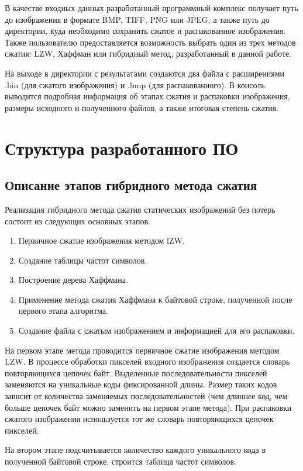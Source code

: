 В качестве входных данных разработанный программный комплекс получает путь до изображения в формате BMP, TIFF, PNG или JPEG, а также путь до директории, куда необходимо сохранить сжатое и распакованное изображения. Также пользователю предоставляется возможность выбрать один из трех методов сжатия: LZW, Хаффман или гибридный метод, разработанный в данной работе.

На выходе в директории с результатами создаются два файла с расширениями .bin (для сжатого изображения) и .bmp (для распакованного). В консоль выводится подробная информация об этапах сжатия и распаковки изображения, размеры исходного и полученного файлов, а также итоговая степень сжатия.

\section{Структура разработанного ПО}

\subsection{Описание этапов гибридного метода сжатия}

Реализация гибридного метода сжатия статических изображений без потерь состоит из следующих основных этапов.
\begin{enumerate}
    \item Первичное сжатие изображения методом lZW.
    \item Создание таблицы частот символов.
    \item Построение дерева Хаффмана.
    \item Применение метода сжатия Хаффмана к байтовой строке, полученной после первого этапа алгоритма.
    \item Создание файла с сжатым изображением и информацией для его распаковки.
\end{enumerate}

На первом этапе метода проводится первичное сжатие изображения методом LZW. В процессе обработки пикселей входного изображения создается словарь повторяющихся цепочек байт. Выделенные последовательности пикселей заменяются на уникальные коды фиксированной длины. Размер таких кодов зависит от количества заменяемых последовательностей (чем длиннее код, чем больше цепочек байт можно заменить на первом этапе метода). При распаковки сжатого изображения используется тот же словарь повторяющихся цепочек пикселей.

На втором этапе подсчитывается количество каждого уникального кода в полученной байтовой строке, строится таблица частот символов.

